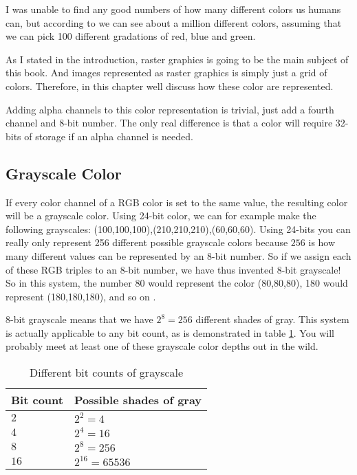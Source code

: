 I was unable to find any good numbers of how many different colors us
humans can, but according to \cite{roth:_tetrachromat} we can see
about a million different colors, assuming  that we can pick 100
different gradations of red, blue and green.

As I stated in the introduction, raster graphics is going to be the
main subject of this book. And images represented as raster graphics
is simply just a grid of colors. Therefore, in this chapter well
discuss how these color are represented.


\newcommand{\rgbaquad}[4]{
  \mbox{(\textcolor{red}{#1},\textcolor{green}{#2},\textcolor{blue}{#3},\textcolor{gray}{#4})}}

Adding alpha channels to this color representation is trivial, just
add a fourth channel and 8-bit number. The only real
difference is that a color will require 32-bits of storage if an
alpha channel is needed.

\subsection{Grayscale Color}

\newcommand{\selfrgbtrip}[3]{\mbox{\textcolor[RGB]{#1,#2,#3}{(#1,#2,#3)}}}
\newcommand{\selfrgbtripgray}[1]{\selfrgbtrip{#1}{#1}{#1}}

If every color channel of a RGB color is set to the same value, the
resulting color will be a grayscale color. Using 24-bit color, we can for example make the following
grayscales:
\selfrgbtripgray{100},\selfrgbtripgray{210},\selfrgbtripgray{60}. Using
24-bits you can really only represent 256 different possible
grayscale colors because $256$ is how many different values can be
represented by an 8-bit number. So if we assign each of these RGB
triples to an 8-bit number, we have thus invented 8-bit
grayscale! So in this system, the number 80
would represent the color \selfrgbtripgray{80}, 180 would represent
\selfrgbtripgray{180}, and so on \cite{puglia00:_handbook_dig_proj}.

8-bit grayscale means that we have $2^8=256$ different shades of
gray. This system is actually applicable to any bit count, as is
demonstrated in table \ref{tab:grayscale}. You will probably meet at least one of
these grayscale color depths out in the wild.

\begin{table}
  \centering
  \begin{tabular}{ll}
    \toprule
    Bit count & Possible shades of gray \\
    \midrule
    $2$ & $2^2 = 4$ \\
    $4$ & $2^4 = 16$ \\
    $8$ & $2^8 = 256$ \\
    $16$ & $2^{16} = 65536$ \\
    \bottomrule
  \end{tabular}
  \caption{Different bit counts of grayscale}
  \label{tab:grayscale}
\end{table}

